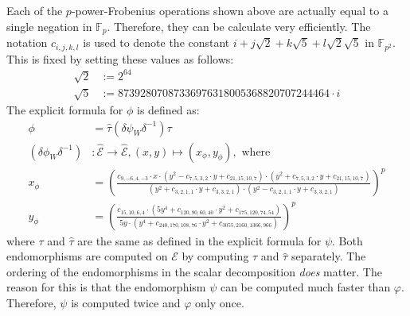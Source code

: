 %
Each of the $p$-power-Frobenius operations shown above are actually equal to a single negation in $\mathbb{F}_p$.
Therefore, they can be calculate very efficiently.
The notation $c_{i, j, k, l}$ is used to denote the constant $i + j \sqrt{2} + k\sqrt{5} + l\sqrt{2}\sqrt{5}$ in $\mathbb{F}_{p^2}$.
This is fixed by setting these values as follows:
%
\begin{align*}
\sqrt{2} &:= 2^ {64} \\
\sqrt{5} &:= 87392807087336976318005368820707244464 \cdot i
\end{align*}
%
The explicit formula for $\phi$ is defined as:
%
\begin{align*}
\phi &= \hat{\tau} (\delta \psi_W \delta^{-1}) \tau \\
%
(\delta \phi_W \delta^{-1})  &: \hat{\mathcal{E}} \to \hat{\mathcal{E}}, (x, y) \mapsto (x_\phi, y_\phi), \text{ where } \\
%
x_\phi &= \left( \frac{c_{9, -6, 4, -3} \cdot x \cdot (y^2 - c_{7, 5, 3, 2} \cdot y + c_{21, 15, 10, 7}) \cdot (y^2 + c_{7, 5, 3, 2} \cdot y + c_{21, 15, 10, 7})}{(y^2 + c_{3,2,1,1} \cdot y + c_{3,3,2,1}) \cdot (y^2 - c_{3,2,1,1} \cdot y + c_{3,3,2,1})} \right)^p \\
%
y_\phi &= \left( \frac{c_{15, 10, 6, 4} \cdot (5y^4 + c_{120, 90, 60, 40} \cdot y^2 + c_{175, 120, 74, 54})}{5y \cdot (y^4 + c_{240, 170, 108, 76} \cdot y^2 + c_{3055, 2160, 1366, 966})} \right)^p
\end{align*}
%
where $\tau$ and $\hat{\tau}$ are the same as defined in the explicit formula for $\psi$.
Both endomorphisms are computed on $\mathcal{E}$ by computing $\tau$ and $\hat{\tau}$ separately.
The ordering of the endomorphisms in the scalar decomposition \emph{does} matter. 
The reason for this is that the endomorphism $\psi$ can be computed much faster than $\varphi$. 
Therefore, $\psi$ is computed twice and $\varphi$ only once.